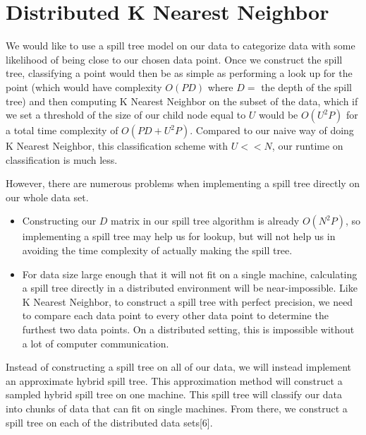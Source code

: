\section{Distributed K Nearest Neighbor}

\vspace{5 mm}
\noindent
We would like to use a spill tree model on our data to categorize data with 
some likelihood of being close to our chosen data point. Once we 
construct the spill tree, classifying a point would then be as simple as 
performing a look up for the point (which would have complexity $O(P D)$ where 
$D = $ the depth of the spill tree) and then computing K Nearest Neighbor on 
the subset of the data, which if we set a threshold of the size of our child 
node equal to $U$ would be $O(U^{2} P)$ for a total time complexity of 
$O(P D + U^{2} P)$. Compared to our naive way of doing K Nearest Neighbor, 
this classification scheme with $U << N$, our runtime on classification is much 
less.

\vspace{5 mm}
\noindent
However, there are numerous problems when implementing a spill tree directly 
on our whole data set.

\begin{itemize}
\item Constructing our $D$ matrix in our spill tree algorithm is already  
$O(N^{2} P)$, so implementing a spill tree may help us for lookup, but will not 
help us in avoiding the time complexity of actually making the spill tree.
\item For data size large enough that it will not fit on a single machine, 
calculating a spill tree directly in a distributed environment will be 
near-impossible. Like K Nearest Neighbor, to construct a spill tree with 
perfect precision, we need to compare each data point to every other data 
point to determine the furthest two data points. On a distributed setting, this 
is impossible without a lot of computer communication.
\end{itemize}

\vspace{5 mm}
\noindent
Instead of constructing a spill tree on all of our data, we will instead 
implement an approximate hybrid spill tree. This approximation method will 
construct a sampled hybrid spill tree on one machine. This spill tree will 
classify our data into chunks of data that can fit on single machines. From 
there, we construct a spill tree on each of the distributed data sets[6].

